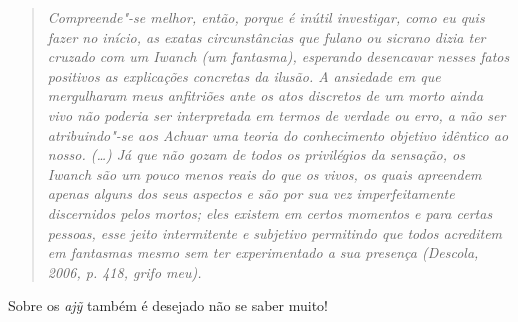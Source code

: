 \begin{quote}
\emph{Compreende"-se melhor, então, porque é inútil investigar, como eu quis
fazer no início, as exatas circunstâncias que fulano ou sicrano dizia
ter cruzado com um Iwanch (um fantasma), esperando desencavar nesses
fatos positivos as explicações concretas da ilusão. A ansiedade em que
mergulharam meus anfitriões ante os atos discretos de um morto ainda
vivo não poderia ser interpretada em termos de verdade ou erro, a não
ser atribuindo"-se aos Achuar uma teoria do conhecimento objetivo
idêntico ao nosso. (\ldots{}) Já que não gozam de todos os privilégios da
sensação, os Iwanch são um pouco menos reais do que os vivos, os quais
apreendem apenas alguns dos seus aspectos e são por sua vez
imperfeitamente discernidos pelos mortos; eles existem em certos
momentos e para certas pessoas, esse jeito intermitente e subjetivo
permitindo que todos acreditem em fantasmas mesmo sem ter experimentado
a sua presença (Descola, 2006, p. 418, grifo meu).}
\end{quote}

Sobre os \emph{ajỹ} também é desejado não se saber muito!
